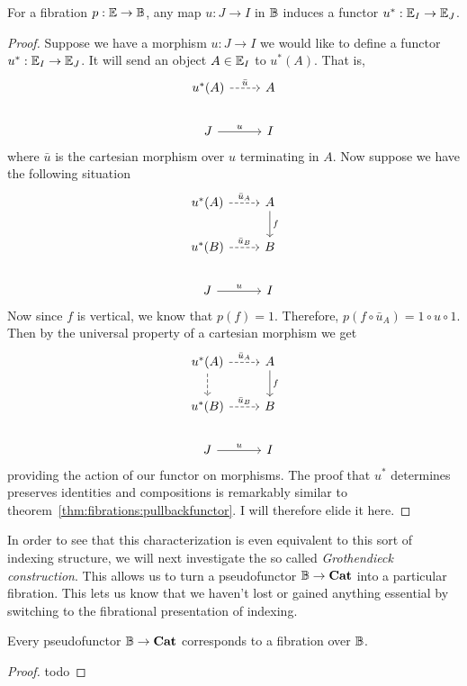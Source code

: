 \begin{thm}\label{thm:fibrations:reindexing}
  For a fibration $p : \mathbb{E} \to \mathbb{B}$, any map $u : J \to I$ in
  $\mathbb{B}$ induces a functor $u^* : \mathbb{E}_I \to \mathbb{E}_J$.
\end{thm}
\begin{proof}
  Suppose we have a morphism $u : J \to I$ we would like to define a
  functor $u^* : \mathbb{E}_I \to \mathbb{E}_J$. It will send an object
  $A \in \mathbb{E}_I$ to $u^*(A)$. That is,
  \[
    \begin{tikzcd}
      u^*(A) \ar[r, dashed, "\bar{u}"] & A\\
      J \ar[r, "u"] & I
    \end{tikzcd}
  \]
  where $\bar{u}$ is the cartesian morphism over $u$ terminating in
  $A$. Now suppose we have the following situation
  \[
    \begin{tikzcd}
      u^*(A) \ar[r, dashed, "\bar{u}_A"] & A \ar[d, "f"]\\
      u^*(B) \ar[r, dashed, "\bar{u}_B"] & B\\
      J \ar[r, "u"] & I
    \end{tikzcd}
  \]
  Now since $f$ is vertical, we know that $p(f) = 1$. Therefore,
  $p(f \circ \bar{u}_A) = 1 \circ u \circ 1$. Then by the universal
  property of a cartesian morphism we get
  \[
    \begin{tikzcd}
      u^*(A) \ar[d, dashed] \ar[r, dashed, "\bar{u}_A"] & A \ar[d, "f"]\\
      u^*(B) \ar[r, dashed, "\bar{u}_B"] & B\\
      J \ar[r, "u"] & I
    \end{tikzcd}
  \]
  providing the action of our functor on morphisms. The proof that
  $u^*$ determines preserves identities and compositions is remarkably
  similar to theorem~\ref{thm:fibrations:pullbackfunctor}. I will
  therefore elide it here.
\end{proof}

In order to see that this characterization is even equivalent to this
sort of indexing structure, we will next investigate the so called
\emph{Grothendieck construction}. This allows us to turn a
pseudofunctor $\mathbb{B} \to \mathbf{Cat}$ into a particular fibration. This
lets us know that we haven't lost or gained anything essential by
switching to the fibrational presentation of indexing.

\begin{thm}\label{thm:fibrations:grothendieckconstruction}
  Every pseudofunctor $\mathbb{B} \to \mathbf{Cat}$ corresponds to a fibration
  over $\mathbb{B}$.
\end{thm}
\begin{proof}
  todo
\end{proof}

